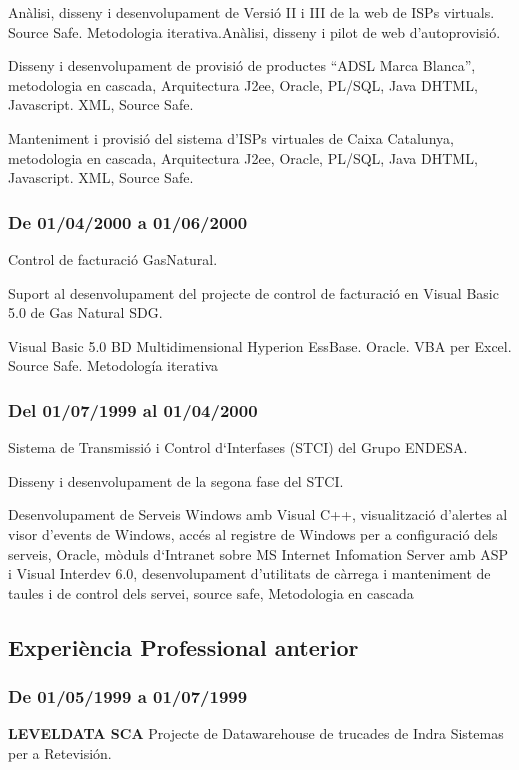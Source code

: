 \documentclass[11pt]{article}
\begin{document}
Anàlisi, disseny i desenvolupament de Versió II i III de la web de ISPs virtuals. Source Safe. Metodologia iterativa.Anàlisi, disseny i pilot de web d’autoprovisió.

Disseny i desenvolupament de provisió de productes “ADSL Marca Blanca'', metodologia en cascada, Arquitectura J2ee, Oracle, PL/SQL, Java DHTML, Javascript. XML, Source Safe.

Manteniment i provisió del sistema d’ISPs virtuales de Caixa Catalunya, metodologia en cascada, Arquitectura J2ee, Oracle, PL/SQL, Java DHTML, Javascript. XML, Source Safe.
\subsubsection{De 01/04/2000 a 01/06/2000}
\label{sec-5-1-14}

Control de facturació GasNatural.

Suport al desenvolupament del projecte de control de facturació en Visual Basic 5.0 de Gas Natural SDG.

Visual Basic 5.0 BD Multidimensional Hyperion EssBase. Oracle. VBA per Excel. Source Safe. Metodología iterativa
\subsubsection{Del 01/07/1999 al 01/04/2000}
\label{sec-5-1-15}

Sistema de Transmissió i Control d‘Interfases (STCI) del Grupo ENDESA.

Disseny i desenvolupament de la segona fase del STCI. 

Desenvolupament de Serveis Windows amb Visual C++, visualització d’alertes al visor d’events de Windows, accés al registre de Windows per a configuració dels serveis, Oracle, mòduls d‘Intranet sobre MS Internet Infomation Server amb ASP i Visual Interdev 6.0, desenvolupament d’utilitats de càrrega i manteniment de taules i de control dels servei, source safe, Metodologia en cascada
\subsection{Experiència Professional anterior}
\label{sec-5-2}
\subsubsection{De 01/05/1999 a 01/07/1999}
\label{sec-5-2-1}

\textbf{LEVELDATA SCA}
Projecte de Datawarehouse de trucades de Indra Sistemas per a Retevisión. 
\end{document}
